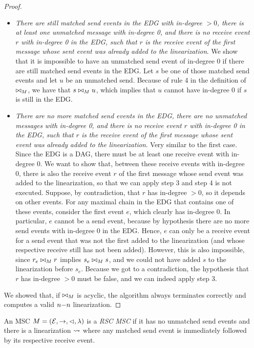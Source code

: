 \documentclass{article}
\begin{document}
\begin{proof}
\begin{itemize}
	\item \emph{There are still matched send events in the EDG with in-degree $>0$, there is at least one unmatched message with in-degree 0, and there is no receive event $r$ with in-degree 0 in the EDG, such that $r$ is the receive event of the first message whose sent event was already added to the linearization}. We show that it is impossible to have an unmatched send event of in-degree 0 if there are still matched send events in the EDG. Let $s$ be one of those matched send events and let $u$ be an unmatched send. Because of rule 4 in the definition of $\bowtie_M$, we have that $s \bowtie_M u$, which implies that $u$ cannot have in-degree 0 if $s$ is still in the EDG.
	\item \emph{There are no more matched send events in the EDG, there are no unmatched messages with in-degree 0, and there is no receive event $r$ with in-degree 0 in the EDG, such that $r$ is the receive event of the first message whose sent event was already added to the linearization}. Very similar to the first case. Since the EDG is a DAG, there must be at least one receive event with in-degree 0. We want to show that, between these receive events with in-degree 0, there is also the receive event $r$ of the first message whose send event was added to the linearization, so that we can apply step 3 and step 4 is not executed. Suppose, by contradiction, that $r$ has in-degree $>0$, so it depends on other events. For any maximal chain in the EDG that contains one of these events, consider the first event $e$, which clearly has in-degree 0. In particular, $e$ cannot be a send event, because by hypothesis there are no more send events with in-degree 0 in the EDG. Hence, $e$ can only be a receive event for a send event that was not the first added to the linearization (and whose respective receive still has not been added). However, this is also impossible, since $r_e \bowtie_M r$ implies $s_e \bowtie_M s$, and we could not have added $s$ to the linearization before $s_e$. Because we got to a contradiction, the hypothesis that $r$ has in-degree $>0$ must be false, and we can indeed apply step 3.
\end{itemize}
We showed that, if $\bowtie_M$ is acyclic, the algorithm always terminates correctly and computes a valid $n\mathsf{-}n$ linearization.
\end{proof}

\begin{definition}\label{def:rsc}
	An MSC $M = (\mathcal{E},\to,\lhd,\lambda)$ is a \emph{RSC MSC} if it has no unmatched send events and there is a linearization $\rightsquigarrow$ where any matched send event is immediately followed by its respective receive event.
\end{definition}
\end{document}

